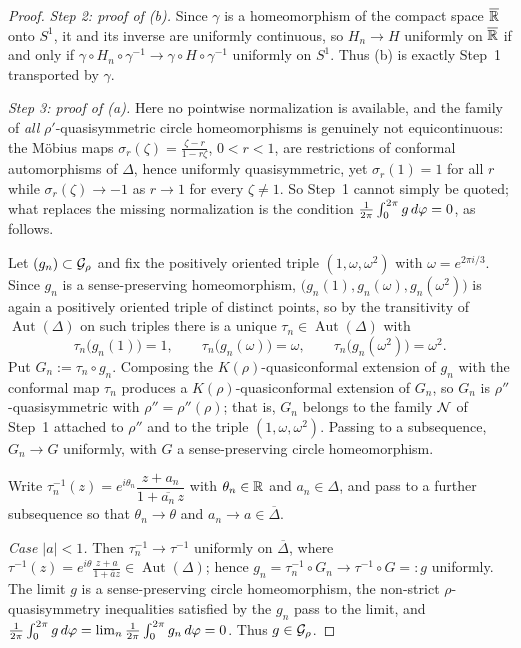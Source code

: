\begin{proof}
	\emph{Step 2: proof of (b).}
	Since $\gamma$ is a homeomorphism of the compact space $\overline{\mathbb{R}}$ onto
	$S^1$, it and its inverse are uniformly continuous, so $H_n\to H$ uniformly on
	$\overline{\mathbb{R}}$ if and only if $\gamma\circ H_n\circ\gamma^{-1}\to\gamma\circ
	H\circ\gamma^{-1}$ uniformly on $S^1$. Thus (b) is exactly Step~1 transported
	by $\gamma$.
	
	\emph{Step 3: proof of (a).}
	Here no pointwise normalization is available, and the family of \emph{all}
	$\rho'$-quasisymmetric circle homeomorphisms is genuinely not equicontinuous:
	the M\"obius maps $\sigma_r(\zeta)=\frac{\zeta-r}{1-r\zeta}$, $0<r<1$, are
	restrictions of conformal automorphisms of $\Delta$, hence uniformly
	quasisymmetric, yet $\sigma_r(1)=1$ for all $r$ while $\sigma_r(\zeta)\to-1$ as
	$r\to1$ for every $\zeta\neq1$. So Step~1 cannot simply be quoted; what
	replaces the missing normalization is the condition $\frac{1}{2\pi}\int_0^{2\pi} g \,d\varphi=0$, as follows.
	
	Let $(g_n)\subset\mathcal{G}_\rho$ and fix the positively oriented triple
	$(1,\omega,\omega^2)$ with $\omega=e^{2\pi i/3}$. Since $g_n$ is a
	sense-preserving homeomorphism, $\bigl(g_n(1),g_n(\omega),g_n(\omega^2)\bigr)$
	is again a positively oriented triple of distinct points, so by the
	transitivity of $\operatorname{Aut}(\Delta)$ on such triples there is a unique
	$\tau_n\in\operatorname{Aut}(\Delta)$ with
	\[
	\tau_n\bigl(g_n(1)\bigr)=1,\qquad
	\tau_n\bigl(g_n(\omega)\bigr)=\omega,\qquad
	\tau_n\bigl(g_n(\omega^2)\bigr)=\omega^2 .
	\]
	Put $G_n:=\tau_n\circ g_n$. Composing the $K(\rho)$-quasiconformal extension of
	$g_n$ with the conformal map $\tau_n$ produces a $K(\rho)$-quasiconformal
	extension of $G_n$, so $G_n$ is $\rho''$-quasisymmetric with
	$\rho''=\rho''(\rho)$; that is, $G_n$ belongs to the family $\mathcal{N}$ of Step~1
	attached to $\rho''$ and to the triple $(1,\omega,\omega^2)$. Passing to a
	subsequence, $G_n\to G$ uniformly, with $G$ a sense-preserving circle
	homeomorphism.
	
	Write $\tau_n^{-1}(z)=e^{i\theta_n}\dfrac{z+a_n}{1+\overline{a_n}\,z}$ with
	$\theta_n\in\mathbb{R}$ and $a_n\in\Delta$, and pass to a further subsequence so that
	$\theta_n\to\theta$ and $a_n\to a\in\overline\Delta$.
	
	\emph{Case $|a|<1$.} Then $\tau_n^{-1}\to\tau^{-1}$ uniformly on
	$\overline\Delta$, where
	$\tau^{-1}(z)=e^{i\theta}\frac{z+a}{1+\bar az}\in\operatorname{Aut}(\Delta)$;
	hence $g_n=\tau_n^{-1}\circ G_n\to\tau^{-1}\circ G=:g$ uniformly. The limit $g$
	is a sense-preserving circle homeomorphism, the non-strict $\rho$-quasisymmetry
	inequalities satisfied by the $g_n$ pass to the limit, and
	$\frac{1}{2\pi}\int_0^{2\pi} g \,d\varphi=\lim_n\frac{1}{2\pi}\int_0^{2\pi} g_n \,d\varphi=0$. Thus $g\in\mathcal{G}_\rho$.
	

\end{proof}
